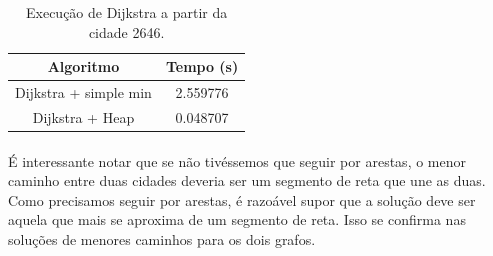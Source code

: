 \documentclass[11pt,a4paper]{article}
\begin{document}
        \begin{table}[htb!]
        \centering
            \begin{tabular}{|c|c|}
            \toprule
            Algoritmo                         & Tempo (s)\\
            \midrule
            Dijkstra + simple min             & 2.559776 \\
            Dijkstra + Heap                   & 0.048707 \\
            \bottomrule
            \end{tabular}
            \caption {Execução de Dijkstra a partir da cidade 2646.}
        \end{table}

        \newpage
        \paragraph{}
        É interessante notar que se não tivéssemos que seguir por arestas, o menor caminho entre duas cidades deveria ser um segmento de reta que une as duas. Como precisamos seguir por arestas, é razoável supor que a solução deve ser aquela que mais se aproxima de um segmento de reta. Isso se confirma nas soluções de menores caminhos para os dois grafos.
         
\end{document}
